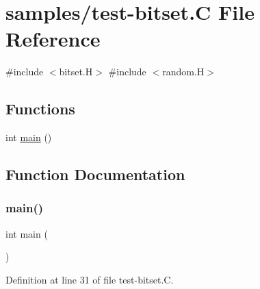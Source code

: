 \hypertarget{test-bitset_8_c}{}\section{samples/test-\/bitset.C File Reference}
\label{test-bitset_8_c}
{\ttfamily \#include $<$bitset.\+H$>$}\newline
{\ttfamily \#include $<$random.\+H$>$}\newline
\subsection*{Functions}
\begin{DoxyCompactItemize}
\item 
int \hyperlink{test-bitset_8_c_ae66f6b31b5ad750f1fe042a706a4e3d4}{main} ()
\end{DoxyCompactItemize}


\subsection{Function Documentation}
\mbox{\label{test-bitset_8_c_ae66f6b31b5ad750f1fe042a706a4e3d4}} 
\subsubsection{\texorpdfstring{main()}{main()}}
{\footnotesize\ttfamily int main (\begin{DoxyParamCaption}{ }\end{DoxyParamCaption})}



Definition at line 31 of file test-\/bitset.\+C.

